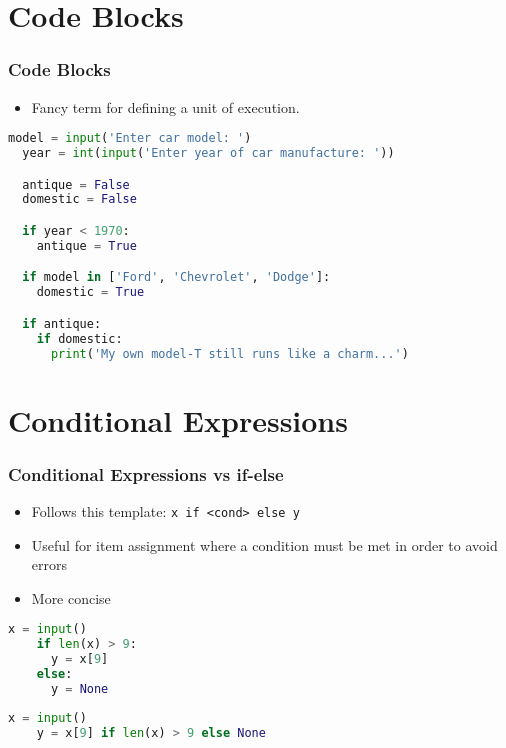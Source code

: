 \documentclass{beamer}
\begin{document}
%
%
\section{Code Blocks}
\begin{frame}[fragile]
  \frametitle{Code Blocks}

  \begin{itemize}
    \item Fancy term for defining a unit of execution.
  \end{itemize}
  \begin{lstlisting}[language=Python, autogobble]
  model = input('Enter car model: ')
  year = int(input('Enter year of car manufacture: '))

  antique = False
  domestic = False

  if year < 1970:
    antique = True

  if model in ['Ford', 'Chevrolet', 'Dodge']:
    domestic = True

  if antique:
    if domestic:
      print('My own model-T still runs like a charm...')
  \end{lstlisting}
\end{frame}

%
%
\section{Conditional Expressions}
\begin{frame}[fragile]
  \frametitle{Conditional Expressions vs if-else}

  \begin{itemize}
    \item Follows this template: \lstinline|x if <cond> else y|
    \item Useful for item assignment where a condition must be met in order to avoid errors
    \item More concise
  \end{itemize}
  \vfill
  \begin{minipage}{0.49\textwidth}
    \begin{lstlisting}[language=Python, autogobble]
    x = input()
    if len(x) > 9:
      y = x[9]
    else:
      y = None
    \end{lstlisting}
  \end{minipage}
  \begin{minipage}{0.49\textwidth}
    \begin{lstlisting}[language=Python, autogobble]
    x = input()
    y = x[9] if len(x) > 9 else None
    \end{lstlisting}
  \end{minipage}
\end{frame}
\end{document}
